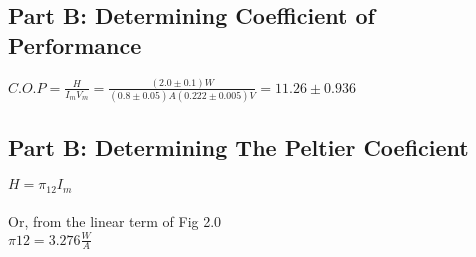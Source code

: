 \documentclass{article}
\begin{document}
\subsection{Part B: Determining Coefficient of Performance}
$C.O.P=\frac{H}{I_mV_m}=\frac{(2.0\pm0.1)W}{(0.8\pm0.05)A(0.222\pm0.005)V}=11.26\pm0.936$
\subsection{Part B: Determining The Peltier Coeficient}
$H=\pi_{12}I_m$\\\\
Or, from the linear term of Fig 2.0\\
$\pi{12}=3.276\frac{W}{A}$



\end{document}
